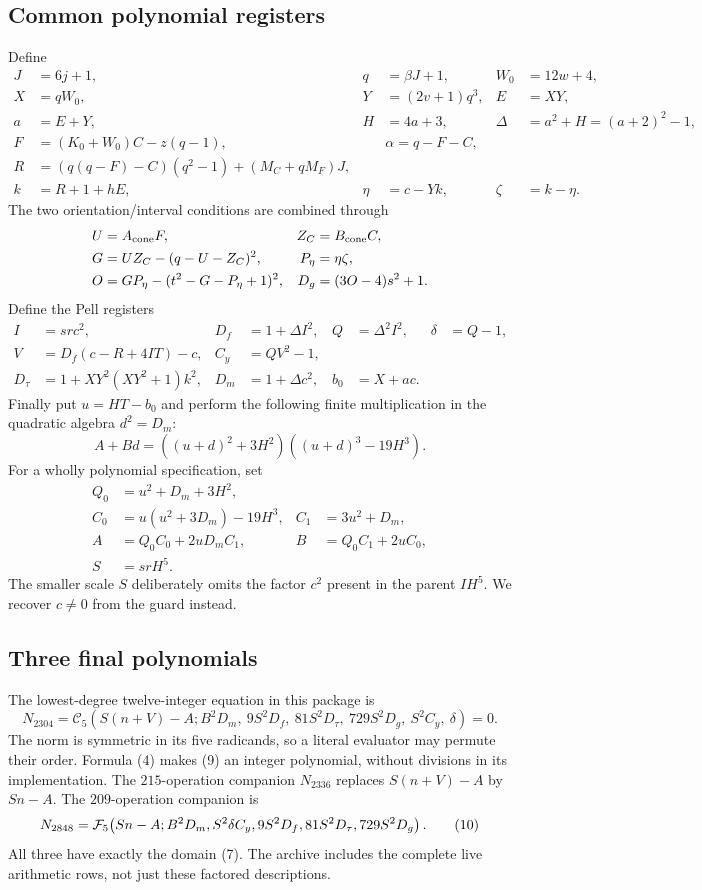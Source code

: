 \documentclass[11pt,letterpaper]{article}
\theoremstyle{definition}\newtheorem{definition}[theorem]{Definition}
\theoremstyle{remark}\newtheorem{remark}[theorem]{Remark}
\begin{document}
\subsection{Common polynomial registers}
Define
\begin{align*}
 J&=6j+1,&q&=\beta J+1,&W_0&=12w+4,\\
 X&=qW_0,&Y&=(2v+1)q^3,&E&=XY,\\
 a&=E+Y,&H&=4a+3,&\Delta&=a^2+H=(a+2)^2-1,\\
 F&=(K_0+W_0)C-z(q-1),&&\alpha=q-F-C,\\
 R&=(q(q-F)-C)(q^2-1)+(M_C+qM_F)J,\\
 k&=R+1+hE,&\eta&=c-Yk,&\zeta&=k-\eta.
\end{align*}
The two orientation/interval conditions are combined through
\begin{align*}
 U&=A_{\rm cone}F,& Z_C&=B_{\rm cone}C,\\
 G&=UZ_C-(q-U-Z_C)^2,&P_\eta&=\eta\zeta,\\
 O&=GP_\eta-(t^2-G-P_\eta+1)^2,&D_g&=(3O-4)s^2+1.
\end{align*}
Define the Pell registers
\begin{align*}
 I&=src^2,&D_f&=1+\Delta I^2,&Q&=\Delta^2I^2,&\delta&=Q-1,\\
 V&=D_f(c-R+4IT)-c,&C_y&=QV^2-1,\\
 D_\tau&=1+XY^2(XY^2+1)k^2,&D_m&=1+\Delta c^2,&b_0&=X+ac.
\end{align*}
Finally put $u=HT-b_0$ and perform the following finite multiplication in the quadratic algebra $d^2=D_m$:
\[
 A+Bd=((u+d)^2+3H^2)((u+d)^3-19H^3).
 \tag{8}\label{eq:AB}
\]
For a wholly polynomial specification, set
\begin{align*}
 Q_0&=u^2+D_m+3H^2,\\
 C_0&=u(u^2+3D_m)-19H^3,& C_1&=3u^2+D_m,\\
 A&=Q_0C_0+2uD_mC_1,&B&=Q_0C_1+2uC_0,\\
 S&=srH^5.
\end{align*}
The smaller scale $S$ deliberately omits the factor $c^2$ present in the parent $IH^5$. We recover $c\ne0$ from the guard instead.

\subsection{Three final polynomials}
The lowest-degree twelve-integer equation in this package is
\[
 \boxed{
 N_{2304}=\mathcal C_5\!\left(
 S(n+V)-A; B^2D_m,\ 9S^2D_f,\ 81S^2D_\tau,
 \ 729S^2D_g,\ S^2C_y,\ \delta\right)=0.}
 \tag{9}\label{eq:main12}
\]
The norm is symmetric in its five radicands, so a literal evaluator may permute their order. Formula (4) makes (9) an integer polynomial, without divisions in its implementation. The $215$-operation companion $N_{2336}$ replaces $S(n+V)-A$ by $Sn-A$. The $209$-operation companion is
\[
 N_{2848}=\mathcal F_5\!\left(Sn-A; B^2D_m,
 S^2\delta C_y,9S^2D_f,81S^2D_\tau,729S^2D_g\right).
 \tag{10}\label{eq:cheap12}
\]
All three have exactly the domain (7). The archive includes the complete live arithmetic rows, not just these factored descriptions.
\end{document}
